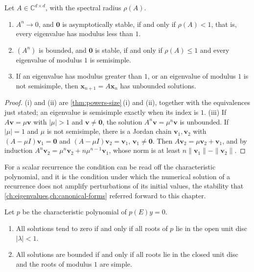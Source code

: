 \begin{theorem}
\label{thm:difference-stability}
Let $A\in\mathbb C^{d\times d}$, with the spectral radius $\rho(A)$.
\begin{enumerate}
\item $A^n\to0$, and $\mathbf 0$ is asymptotically stable, if and only if $\rho(A)<1$, that is, every eigenvalue has modulus less than $1$.
\item $(A^n)$ is bounded, and $\mathbf 0$ is stable, if and only if $\rho(A)\le1$ and every eigenvalue of modulus $1$ is semisimple.
\item If an eigenvalue has modulus greater than $1$, or an eigenvalue of modulus $1$ is not semisimple, then $\mathbf x_{n+1}=A\mathbf x_n$ has unbounded solutions.
\end{enumerate}
\end{theorem}

\begin{proof}
(i) and (ii) are \cref{thm:powers-size}\,(i) and (ii), together with the equivalences just stated; an eigenvalue is semisimple exactly when its index is $1$. (iii) If $A\mathbf v=\mu\mathbf v$ with $|\mu|>1$ and $\mathbf v\ne\mathbf 0$, the solution $A^n\mathbf v=\mu^n\mathbf v$ is unbounded. If $|\mu|=1$ and $\mu$ is not semisimple, there is a Jordan chain $\mathbf v_1,\mathbf v_2$ with $(A-\mu I)\mathbf v_1=\mathbf 0$ and $(A-\mu I)\mathbf v_2=\mathbf v_1$, $\mathbf v_1\ne\mathbf 0$. Then $A\mathbf v_2=\mu\mathbf v_2+\mathbf v_1$, and by induction $A^n\mathbf v_2=\mu^n\mathbf v_2+n\mu^{n-1}\mathbf v_1$, whose norm is at least $n\|\mathbf v_1\|-\|\mathbf v_2\|$.
\end{proof}

For a scalar recurrence the condition can be read off the characteristic polynomial, and it is the condition under which the numerical solution of a recurrence does not amplify perturbations of its initial values, the stability that \cref{ch:eigenvalues,ch:canonical-forms} referred forward to this chapter.

\begin{corollary}
\label{cor:scalar-recurrence-stability}
Let $p$ be the characteristic polynomial of $p(E)y=0$.
\begin{enumerate}
\item All solutions tend to zero if and only if all roots of $p$ lie in the open unit disc $|\lambda|<1$.
\item All solutions are bounded if and only if all roots lie in the closed unit disc and the roots of modulus $1$ are simple.
\end{enumerate}
\end{corollary}

